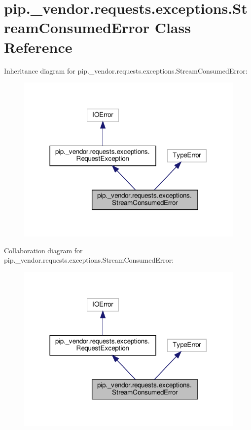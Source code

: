 \hypertarget{classpip_1_1__vendor_1_1requests_1_1exceptions_1_1StreamConsumedError}{}\section{pip.\+\_\+vendor.\+requests.\+exceptions.\+Stream\+Consumed\+Error Class Reference}
\label{classpip_1_1__vendor_1_1requests_1_1exceptions_1_1StreamConsumedError}


Inheritance diagram for pip.\+\_\+vendor.\+requests.\+exceptions.\+Stream\+Consumed\+Error\+:
\nopagebreak
\begin{figure}[H]
\begin{center}
\leavevmode
\includegraphics[width=318pt]{classpip_1_1__vendor_1_1requests_1_1exceptions_1_1StreamConsumedError__inherit__graph}
\end{center}
\end{figure}


Collaboration diagram for pip.\+\_\+vendor.\+requests.\+exceptions.\+Stream\+Consumed\+Error\+:
\nopagebreak
\begin{figure}[H]
\begin{center}
\leavevmode
\includegraphics[width=318pt]{classpip_1_1__vendor_1_1requests_1_1exceptions_1_1StreamConsumedError__coll__graph}
\end{center}
\end{figure}
